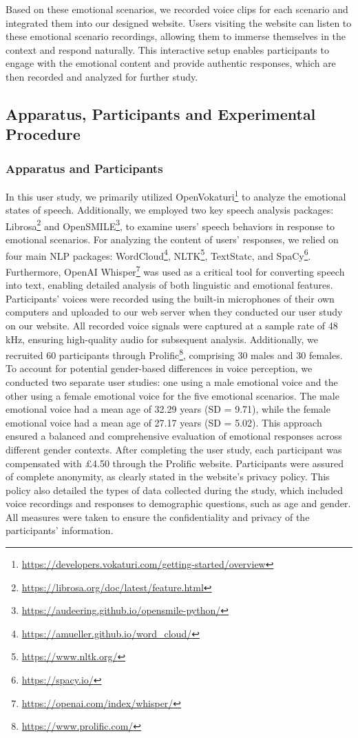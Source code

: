 Based on these emotional scenarios, we recorded voice clips for each scenario and integrated them into our designed website. Users visiting the website can listen to these emotional scenario recordings, allowing them to immerse themselves in the context and respond naturally. This interactive setup enables participants to engage with the emotional content and provide authentic responses, which are then recorded and analyzed for further study.

\subsection{Apparatus, Participants and Experimental Procedure}
\subsubsection{Apparatus and Participants}
In this user study, we primarily utilized OpenVokaturi\footnote{\url{https://developers.vokaturi.com/getting-started/overview}} to analyze the emotional states of speech. Additionally, we employed two key speech analysis packages: Librosa\footnote{\url{https://librosa.org/doc/latest/feature.html}} and OpenSMILE\footnote{\url{https://audeering.github.io/opensmile-python/}}, to examine users' speech behaviors in response to emotional scenarios. For analyzing the content of users' responses, we relied on four main NLP packages: WordCloud\footnote{\url{https://amueller.github.io/word_cloud/}}, NLTK\footnote{\url{https://www.nltk.org/}}, TextStatc, and SpaCy\footnote{\url{https://spacy.io/}}. Furthermore, OpenAI Whisper\footnote{\url{https://openai.com/index/whisper/}} was used as a critical tool for converting speech into text, enabling detailed analysis of both linguistic and emotional features. Participants' voices were recorded using the built-in microphones of their own computers and uploaded to our web server when they conducted our user study on our website. All recorded voice signals were captured at a sample rate of 48 kHz, ensuring high-quality audio for subsequent analysis.
Additionally, we recruited 60 participants through Prolific\footnote{\url{https://www.prolific.com/}}, comprising 30 males and 30 females. To account for potential gender-based differences in voice perception, we conducted two separate user studies: one using a male emotional voice and the other using a female emotional voice for the five emotional scenarios. The male emotional voice had a mean age of 32.29 years (SD = 9.71), while the female emotional voice had a mean age of 27.17 years (SD = 5.02). This approach ensured a balanced and comprehensive evaluation of emotional responses across different gender contexts.
After completing the user study, each participant was compensated with £4.50 through the Prolific website. Participants were assured of complete anonymity, as clearly stated in the website's privacy policy. This policy also detailed the types of data collected during the study, which included voice recordings and responses to demographic questions, such as age and gender. All measures were taken to ensure the confidentiality and privacy of the participants' information.

